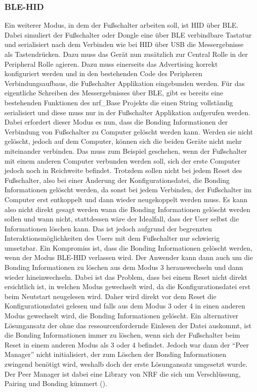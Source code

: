 \subsubsection{BLE-HID}
Ein weiterer Modus, in dem der Fußschalter arbeiten soll, ist \ac{HID} über \ac{BLE}. Dabei simuliert der Fußschalter oder Dongle eine über \ac{BLE} verbindbare Tastatur und serialisiert nach dem Verbinden wie bei \ac{HID} über USB die Messergebnisse als Tastendrücken. Dazu muss das Gerät nun zusätzlich zur Central Rolle in der Peripheral Rolle agieren. Dazu muss einerseits das Advertising korrekt konfiguriert werden und in den bestehenden Code des Peripheren Verbindungsaufbaus, die Fußschalter Applikation eingebunden werden. Für das eigentliche Schreiben des Messergebnisses über \ac{BLE}, gibt es bereits eine bestehenden Funktionen des nrf\_Base Projekts die einen String vollständig serialisiert und diese muss nur in der Fußschalter Applikation aufgerufen werden.\\
Dabei erfordert dieser Modus es nun, dass die Bonding Informationen der Verbindung von Fußschalter zu Computer gelöscht werden kann. Werden sie nicht gelöscht, jedoch auf dem Computer, können sich die beiden Geräte nicht mehr miteinander verbinden. Das muss zum Beispiel geschehen, wenn der Fußschalter mit einem anderen Computer verbunden werden soll, sich der erste Computer jedoch noch in Reichweite befindet. Trotzdem sollen nicht bei jedem Reset des Fußschalter, also bei einer Änderung der Konfigurationsdatei, die Bonding Informationen gelöscht werden, da sonst bei jedem Verbinden, der Fußschalter im Computer erst entkoppelt und dann wieder neugekoppelt werden muss. Es kann also nicht direkt gesagt werden wann die Bonding Informationen gelöscht werden sollen und wann nicht, stattdessen wäre der Idealfall, dass der User selbst die Informationen löschen kann. Das ist jedoch aufgrund der begrenzten Interaktionsmöglichkeiten des Users mit dem Fußschalter nur schwierig umsetzbar. Ein Kompromiss ist, dass die Bonding Informationen gelöscht werden, wenn der Modus \ac{BLE}-\ac{HID} verlassen wird. Der Anwender kann dann auch um die Bonding Informationen zu löschen aus dem Modus 3 herauswechseln und dann wieder hineinwechseln. Dabei ist das Problem, dass bei einem Reset nicht direkt ersichtlich ist, in welchen Modus gewechselt wird, da die Konfigurationsdatei erst beim Neutstart neugelesen wird. Daher wird direkt vor dem Reset die Konfigurationsdatei gelesen und falls aus dem Modus 3 oder 4 in einen anderen Modus gewechselt wird, die Bonding Informationen gelöscht. Ein alternativer Lösungansatz der ohne das ressourcenfordernde Einlesen der Datei auskommt, ist die Bonding Informationen immer zu löschen, wenn sich der Fußschalter beim Reset in einem anderen Modus als 3 oder 4 befindet. Jedoch war dann der ``Peer Manager'' nicht initialisiert, der zum Löschen der Bonding Informationen zwingend benötigt wird, weshalb doch der erste Lösungansatz umgesetzt wurde. Der Peer Manager ist dabei eine Library von NRF die sich um Verschlüssung, Pairing und Bonding kümmert (\cite[]{NRF_PeerManager}).\\
